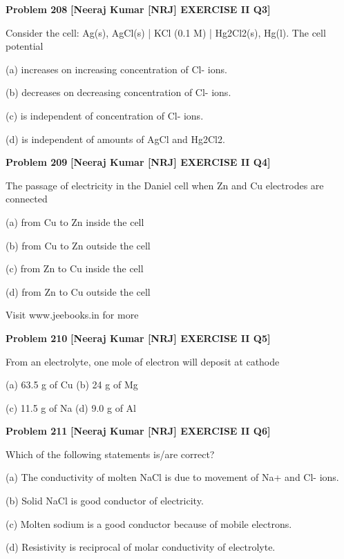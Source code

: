 \begin{problembox}
\textbf{Problem 208} \hfill \textbf{[Neeraj Kumar [NRJ] EXERCISE II Q3]}
\label{q:ext-nrj_all_questions-208}

Consider the cell: Ag(s), AgCl(s) | KCl (0.1 M) | 
Hg2Cl2(s), Hg(l). The cell  potential
 
 (a)  increases on increasing concentration of 
Cl- ions.
 
 (b)  decreases on decreasing concentration of 
Cl- ions.
 
 (c)  is independent of concentration of Cl- ions.
 
 (d)  is independent of amounts of AgCl and 
Hg2Cl2.
\end{problembox}

\begin{problembox}
\textbf{Problem 209} \hfill \textbf{[Neeraj Kumar [NRJ] EXERCISE II Q4]}
\label{q:ext-nrj_all_questions-209}

The passage of electricity in the Daniel cell when 
Zn and Cu electrodes are connected
 
 (a) from Cu to Zn inside the cell
 
 (b) from Cu to Zn outside the cell
 
 (c) from Zn to Cu inside the cell
 
 (d) from Zn to Cu outside the cell
 
 
Visit www.jeebooks.in for more
\end{problembox}

\begin{problembox}
\textbf{Problem 210} \hfill \textbf{[Neeraj Kumar [NRJ] EXERCISE II Q5]}
\label{q:ext-nrj_all_questions-210}

From an electrolyte, one mole of electron will 
deposit at cathode
 
 (a) 63.5 g of Cu 
(b) 24 g of Mg
 
 (c) 11.5 g of Na 
(d) 9.0 g of Al
\end{problembox}

\begin{problembox}
\textbf{Problem 211} \hfill \textbf{[Neeraj Kumar [NRJ] EXERCISE II Q6]}
\label{q:ext-nrj_all_questions-211}

Which of the following statements is/are correct?
 
 (a)  The conductivity of molten NaCl is due to 
movement of Na+ and Cl- ions.
 
 (b)  Solid NaCl is good conductor of electricity.
 
 (c)  Molten sodium is a good conductor because 
of mobile electrons.
 
 (d)  Resistivity is reciprocal of molar conductivity 
of electrolyte.
\end{problembox}

